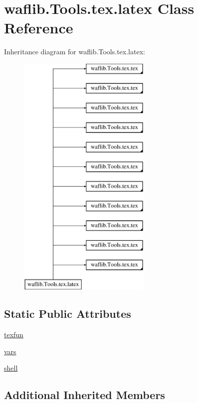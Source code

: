 \hypertarget{classwaflib_1_1_tools_1_1tex_1_1latex}{}\section{waflib.\+Tools.\+tex.\+latex Class Reference}
\label{classwaflib_1_1_tools_1_1tex_1_1latex}
Inheritance diagram for waflib.\+Tools.\+tex.\+latex\+:\begin{figure}[H]
\begin{center}
\leavevmode
\includegraphics[height=12.000000cm]{classwaflib_1_1_tools_1_1tex_1_1latex}
\end{center}
\end{figure}
\subsection*{Static Public Attributes}
\begin{DoxyCompactItemize}
\item 
\hyperlink{classwaflib_1_1_tools_1_1tex_1_1latex_afe6f036808f437b1973143b3bfa013e9}{texfun}
\item 
\hyperlink{classwaflib_1_1_tools_1_1tex_1_1latex_a1377bf11d409dad09761f03aa63f97fc}{vars}
\item 
\hyperlink{classwaflib_1_1_tools_1_1tex_1_1latex_a484dc715f52d249bd2fef4c99a0d6b36}{shell}
\end{DoxyCompactItemize}
\subsection*{Additional Inherited Members}


